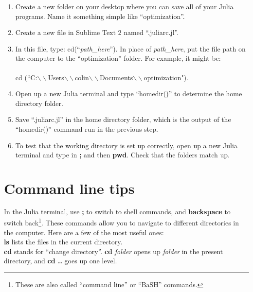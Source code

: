\documentclass[12pt]{article}
\begin{document}
\begin{enumerate}

\item Create a new folder on your desktop where you can save all of your Julia programs.  Name it something simple like ``optimization''.  

\item Create a new file in Sublime Text 2 named ``.juliarc.jl''.  

\item In this file, type: cd(``\emph{path\_here}'').  In place of \emph{path\_here}, put the file path on the computer to the ``optimization'' folder.  For example, it might be: \\\\
cd (``C:$\backslash\backslash$Users$\backslash\backslash$colin$\backslash\backslash$Documents$\backslash\backslash$optimization").  

\item Open up a new Julia terminal and type ``homedir()'' to determine the home directory folder.   

\item Save ``.juliarc.jl'' in the home directory folder, which is the output of the ``homedir()'' command run in the previous step.   

\item To test that the working directory is set up correctly, open up a new Julia terminal and type in {\bf ;} and then {\bf pwd}.  Check that the folders match up.  

\end{enumerate}

\section{Command line tips}
In the Julia terminal, use {\bf ;} to switch to shell commands, and {\bf backspace} to switch back\footnote{These are also called ``command line'' or ``BaSH'' commands. }.  These commands allow you to navigate to different directories in the computer.   Here are a few of the most useful ones:\\

{\bf ls} lists the files in the current directory.  \\

{\bf cd} stands for ``change directory''.  {\bf cd} \emph{folder} opens up \emph{folder} in the present directory, and {\bf cd ..} goes up one level. \\
\end{document}
